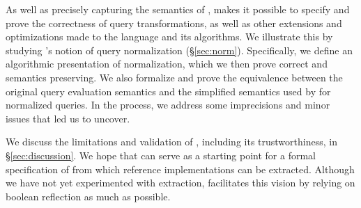 As well as precisely capturing the semantics of \gql, \gcoql makes it possible to specify and prove the correctness of query transformations, as well as other extensions and optimizations made to the language and its algorithms. We illustrate this by studying \HP's notion of query normalization (\S\ref{sec:norm}). Specifically, we define an algorithmic presentation of normalization, which we then prove correct and semantics preserving. We also formalize and prove the equivalence between the original query evaluation semantics and the simplified semantics used by \HP for normalized queries. In the process, we address some imprecisions and minor issues that \coq led us to uncover.

%
We discuss the limitations and validation of \gcoql, including its trustworthiness, in \S\ref{sec:discussion}.
%
We hope that \gcoql can serve as a starting point for a formal specification of \gql from which reference implementations can be extracted. Although we have not yet experimented with extraction, \gcoql facilitates this vision by relying on boolean reflection as much as possible.




